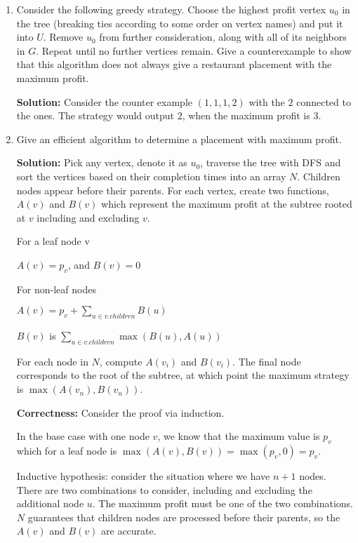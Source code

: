 \documentclass[12pt]{article}
\begin{document}
\begin{enumerate}[label=\textbf{\arabic*}]
	\item Consider the following greedy strategy. Choose the highest profit vertex $u_0$ in the tree (breaking ties according to some order on vertex names) and put it into $U$. Remove $u_0$ from further consideration, along with all of its neighbors in $G$. Repeat until no further vertices remain. Give a counterexample to show that this algorithm does not always give a restaurant placement with the maximum profit. \\
	\par{\textbf{Solution:} Consider the counter example $(1, 1, 1, 2)$ with the $2$ connected to the ones. The strategy would output $2$, when the maximum profit is $3$.}
	\item Give an efficient algorithm to determine a placement with maximum profit. \\
	\par{\textbf{Solution:} Pick any vertex, denote it as $u_0$, traverse the tree with DFS and sort the vertices based on their completion times into an array $N$. Children nodes appear before their parents. For each vertex, create two functions, $A(v)$ and $B(v)$ which represent the maximum profit at the subtree rooted at $v$ including and excluding $v$.}
	\par{For a leaf node v}
	\par{$A(v) = p_v$, and $B(v) = 0$}
	\par{For non-leaf nodes}
	\par{$A(v) = p_v + \sum_{u \in v.children}B(u)$}
	\par{$B(v)$ is $\sum_{u \in v.children}\max{(B(u), A(u))}$}
	\par{For each node in $N$, compute $A(v_i)$ and $B(v_i)$. The final node corresponds to the root of the subtree, at which point the maximum strategy is $\max{(A(v_n), B(v_n))}$.}
	\par{\textbf{Correctness:} Consider the proof via induction.}
	\par{In the base case with one node $v$, we know that the maximum value is $p_v$ which for a leaf node is $\max{(A(v), B(v))} = \max{(p_v, 0)} = p_v$.}
	\par{Inductive hypothesis: consider the situation where we have $n + 1$ nodes. There are two combinations to consider, including and excluding the additional node $u$. The maximum profit must be one of the two combinations. $N$ guarantees that children nodes are processed before their parents, so the $A(v)$ and $B(v)$ are accurate.}

\end{enumerate}
\end{document}

